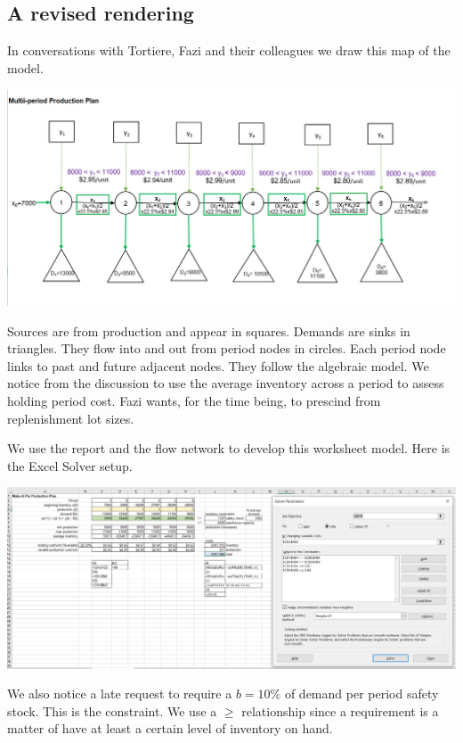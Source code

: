 \documentclass[
]{book}
\begin{document}
\hypertarget{a-revised-rendering}{%
\subsection{A revised rendering}\label{a-revised-rendering}}

In conversations with Tortiere, Fazi and their colleagues we draw this map of the model.

\includegraphics{images/04/mult-prod-network.jpg}

Sources are from production and appear in squares. Demands are sinks in triangles. They flow into and out from period nodes in circles. Each period node links to past and future adjacent nodes. They follow the algebraic model. We notice from the discussion to use the average inventory across a period to assess holding period cost. Fazi wants, for the time being, to prescind from replenishment lot sizes.

We use the report and the flow network to develop this worksheet model. Here is the Excel Solver setup.

\includegraphics{images/04/multi-prod-solver-setup.jpg}

We also notice a late request to require a \(b = 10\)\% of demand per period safety stock. This is the constraint. We use a \(\geq\) relationship since a requirement is a matter of have at least a certain level of inventory on hand.
\end{document}
